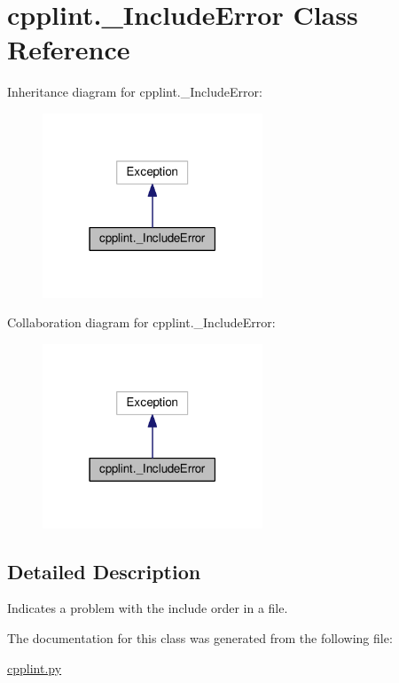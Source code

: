 \hypertarget{classcpplint_1_1__IncludeError}{}\section{cpplint.\+\_\+\+Include\+Error Class Reference}
\label{classcpplint_1_1__IncludeError}


Inheritance diagram for cpplint.\+\_\+\+Include\+Error\+:\nopagebreak
\begin{figure}[H]
\begin{center}
\leavevmode
\includegraphics[width=186pt]{classcpplint_1_1__IncludeError__inherit__graph}
\end{center}
\end{figure}


Collaboration diagram for cpplint.\+\_\+\+Include\+Error\+:\nopagebreak
\begin{figure}[H]
\begin{center}
\leavevmode
\includegraphics[width=186pt]{classcpplint_1_1__IncludeError__coll__graph}
\end{center}
\end{figure}


\subsection{Detailed Description}
\begin{DoxyVerb}Indicates a problem with the include order in a file.\end{DoxyVerb}
 

The documentation for this class was generated from the following file\+:\begin{DoxyCompactItemize}
\item 
\hyperlink{cpplint_8py}{cpplint.\+py}\end{DoxyCompactItemize}
